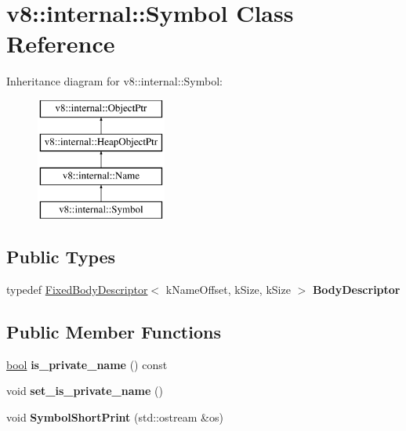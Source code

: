 \hypertarget{classv8_1_1internal_1_1Symbol}{}\section{v8\+:\+:internal\+:\+:Symbol Class Reference}
\label{classv8_1_1internal_1_1Symbol}
Inheritance diagram for v8\+:\+:internal\+:\+:Symbol\+:\begin{figure}[H]
\begin{center}
\leavevmode
\includegraphics[height=4.000000cm]{classv8_1_1internal_1_1Symbol}
\end{center}
\end{figure}
\subsection*{Public Types}
\begin{DoxyCompactItemize}
\item 
\mbox{\label{classv8_1_1internal_1_1Symbol_a8c32873dea17ff48a7c1b2ee9dfe245a}} 
typedef \mbox{\hyperlink{classv8_1_1internal_1_1FixedBodyDescriptor}{Fixed\+Body\+Descriptor}}$<$ k\+Name\+Offset, k\+Size, k\+Size $>$ {\bfseries Body\+Descriptor}
\end{DoxyCompactItemize}
\subsection*{Public Member Functions}
\begin{DoxyCompactItemize}
\item 
\mbox{\label{classv8_1_1internal_1_1Symbol_a0761a325e64b67869e638c808f61e2fe}} 
\mbox{\hyperlink{classbool}{bool}} {\bfseries is\+\_\+private\+\_\+name} () const
\item 
\mbox{\label{classv8_1_1internal_1_1Symbol_a34e54c93dceca23d4dab1e9e9e5db3df}} 
void {\bfseries set\+\_\+is\+\_\+private\+\_\+name} ()
\item 
\mbox{\label{classv8_1_1internal_1_1Symbol_adfba548a4d8b7b609f8a8031f42bc45a}} 
void {\bfseries Symbol\+Short\+Print} (std\+::ostream \&os)
\end{DoxyCompactItemize}
